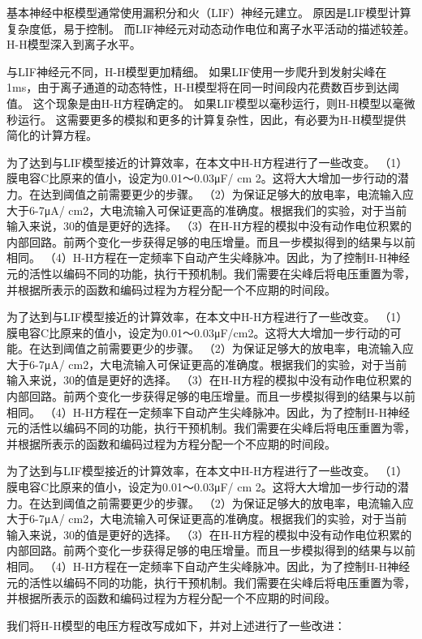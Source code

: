 \documentclass[a4paper,12pt]{ctexart}
\begin{document}
基本神经中枢模型通常使用漏积分和火（LIF）神经元建立。 原因是LIF模型计算复杂度低，易于控制。 而LIF神经元对动态动作电位和离子水平活动的描述较差。 H-H模型深入到离子水平。

与LIF神经元不同，H-H模型更加精细。 如果LIF使用一步爬升到发射尖峰在1ms，由于离子通道的动态特性，H-H模型将在同一时间段内花费数百步到达阈值。 这个现象是由H-H方程确定的。 如果LIF模型以毫秒运行，则H-H模型以毫微秒运行。 这需要更多的模拟和更多的计算复杂性，因此，有必要为H-H模型提供简化的计算方程。

为了达到与LIF模型接近的计算效率，在本文中H-H方程进行了一些改变。 （1）膜电容C比原来的值小，设定为0.01〜0.03μF/ cm 2。这将大大增加一步行动的潜力。在达到阈值之前需要更少的步骤。 （2）为保证足够大的放电率，电流输入应大于6-7μA/ cm2，大电流输入可保证更高的准确度。根据我们的实验，对于当前输入来说，30的值是更好的选择。 （3）在H-H方程的模拟中没有动作电位积累的内部回路。前两个变化一步获得足够的电压增量。而且一步模拟得到的结果与以前相同。 （4）H-H方程在一定频率下自动产生尖峰脉冲。因此，为了控制H-H神经元的活性以编码不同的功能，执行干预机制。我们需要在尖峰后将电压重置为零，并根据所表示的函数和编码过程为方程分配一个不应期的时间段。


为了达到与LIF模型接近的计算效率，在本文中H-H方程进行了一些改变。 （1）膜电容C比原来的值小，设定为0.01〜0.03μF/cm2。这将大大增加一步行动的可能。在达到阈值之前需要更少的步骤。 （2）为保证足够大的放电率，电流输入应大于6-7μA/ cm2，大电流输入可保证更高的准确度。根据我们的实验，对于当前输入来说，30的值是更好的选择。 （3）在H-H方程的模拟中没有动作电位积累的内部回路。前两个变化一步获得足够的电压增量。而且一步模拟得到的结果与以前相同。 （4）H-H方程在一定频率下自动产生尖峰脉冲。因此，为了控制H-H神经元的活性以编码不同的功能，执行干预机制。我们需要在尖峰后将电压重置为零，并根据所表示的函数和编码过程为方程分配一个不应期的时间段。

为了达到与LIF模型接近的计算效率，在本文中H-H方程进行了一些改变。 （1）膜电容C比原来的值小，设定为0.01〜0.03μF/ cm 2。这将大大增加一步行动的潜力。在达到阈值之前需要更少的步骤。 （2）为保证足够大的放电率，电流输入应大于6-7μA/ cm2，大电流输入可保证更高的准确度。根据我们的实验，对于当前输入来说，30的值是更好的选择。 （3）在H-H方程的模拟中没有动作电位积累的内部回路。前两个变化一步获得足够的电压增量。而且一步模拟得到的结果与以前相同。 （4）H-H方程在一定频率下自动产生尖峰脉冲。因此，为了控制H-H神经元的活性以编码不同的功能，执行干预机制。我们需要在尖峰后将电压重置为零，并根据所表示的函数和编码过程为方程分配一个不应期的时间段。

我们将H-H模型的电压方程改写成如下，并对上述进行了一些改进：
\end{document}
